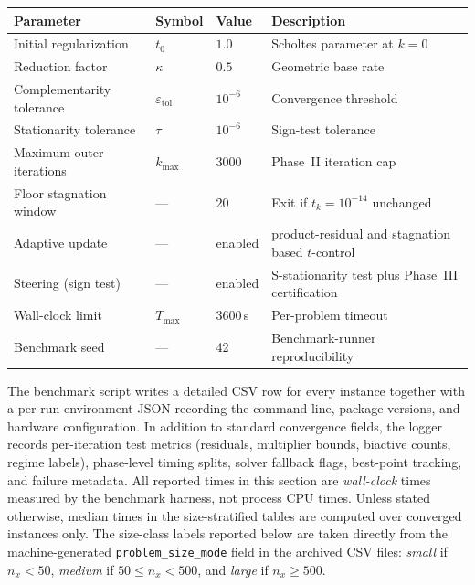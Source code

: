 \begin{table}[!htb]
{\begin{tabular}{@{}llll@{}}
\toprule
Parameter & Symbol & Value & Description \\
\midrule
Initial regularization   & $t_0$              & $1.0$       & Scholtes parameter at $k=0$ \\
Reduction factor         & $\kappa$           & $0.5$       & Geometric base rate \\
Complementarity tolerance& $\varepsilon_{\mathrm{tol}}$ & $10^{-6}$ & Convergence threshold \\
Stationarity tolerance   & $\tau$             & $10^{-6}$   & Sign-test tolerance \\
Maximum outer iterations & $k_{\max}$         & $3000$      & Phase~II iteration cap \\
Floor stagnation window  & ---                & $20$        & Exit if $t_k=10^{-14}$ unchanged \\
Adaptive update          & ---                & enabled     & product-residual and stagnation based $t$-control \\
Steering (sign test)     & ---                & enabled     & S-stationarity test plus Phase~III certification \\
Wall-clock limit         & $T_{\max}$         & $3600\,$s   & Per-problem timeout \\
Benchmark seed           & ---                & 42          & Benchmark-runner reproducibility \\
\bottomrule
\end{tabular}}
\label{tab:params}
\end{table}

The benchmark script writes a detailed CSV row for every instance
together with a per-run environment JSON recording the command line,
package versions, and hardware configuration. In addition to standard
convergence fields, the logger records per-iteration test metrics
(residuals, multiplier bounds, biactive counts, regime labels),
phase-level timing splits, solver fallback flags, best-point tracking,
and failure metadata. All reported times in this section are
\emph{wall-clock} times measured by the benchmark harness, not process
CPU times. Unless stated otherwise, median times in the size-stratified
tables are computed over converged instances only.
The size-class labels reported below are taken directly from the
machine-generated \texttt{problem\_size\_mode} field in the archived
CSV files: \emph{small} if $n_x < 50$, \emph{medium} if
$50 \le n_x < 500$, and \emph{large} if $n_x \ge 500$.

